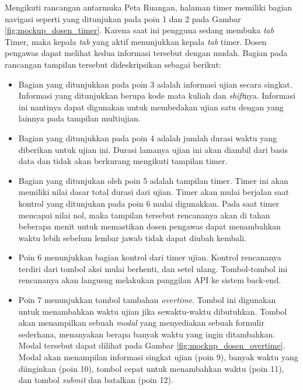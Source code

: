     Mengikuti rancangan antarmuka Peta Ruangan, halaman timer memiliki bagian navigasi seperti
    yang ditunjukan pada poin 1 dan 2 pada Gambar \ref{fig:mockup_dosen_timer}. Karena saat ini
    pengguna sedang membuka \textit{tab} Timer, maka kepala \textit{tab} yang aktif menunjukkan
    kepala \textit{tab} timer. Dosen pengawas dapat melihat kedua informasi tersebut dengan mudah.
    Bagian pada rancangan tampilan tersebut dideskripsikan sebagai berikut:
    
    \begin{itemize}
        \item Bagian yang ditunjukkan pada poin 3 adalah informasi ujian secara singkat. Informasi yang ditunjukkan
            berupa kode mata kuliah dan \textit{shift}nya. Informasi ini nantinya dapat digunakan untuk membedakan
            ujian satu dengan yang lainnya pada tampilan multiujian.
            
        \item Bagian yang ditunjukkan pada poin 4 adalah jumlah durasi waktu yang diberikan untuk ujian ini. Durasi
            lamanya ujian ini akan diambil dari basis data dan tidak akan berkurang mengikuti tampilan timer.
        
        \item Bagian yang ditunjukan oleh poin 5 adalah tampilan timer. Timer ini akan memiliki nilai dasar total
            durasi dari ujian. Timer akan mulai berjalan saat kontrol yang ditunjukan pada poin 6 mulai digunakkan.
            Pada saat timer mencapai nilai nol, maka tampilan tersebut rencananya akan di tahan beberapa menit
            untuk memastikan dosen pengawas dapat menambahkan waktu lebih sebelum lembar jawab tidak dapat diubah
            kembali.
        
        \item Poin 6 menunjukkan bagian kontrol dari timer ujian. Kontrol rencananya terdiri dari tombol aksi mulai
            berhenti, dan setel ulang. Tombol-tombol ini rencananya akan langusng melakukan panggilan API
            ke sistem back-end.
        
        \item Poin 7 menunjukkan tombol tambahan \textit{overtime}. Tombol ini digunakan untuk menambahkan waktu
            ujian jika sewaktu-waktu dibutuhkan. Tombol akan menampilkan sebuah \textit{modal} yang menyediakan
            sebuah formulir sederhana, menanyakan berapa banyak waktu yang ingin ditambahkan. Modal tersebut
            dapat dilihat pada Gambar \ref{fig:mockup_dosen_overtime}. Modal akan menampilan informasi
            singkat ujian (poin 9), banyak waktu yang diinginkan (poin 10), tombol cepat untuk menambahkan waktu
            (poin 11), dan tombol \textit{submit} dan batalkan (poin 12).
        

\end{itemize}

